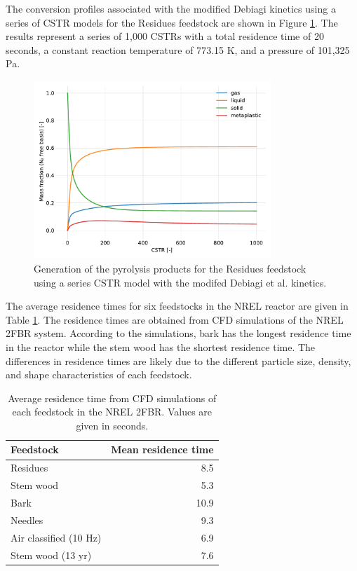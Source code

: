 The conversion profiles associated with the modified Debiagi kinetics using a series of CSTR models for the Residues feedstock are shown in Figure \ref{fig:cstr-products}. The results represent a series of 1,000 CSTRs with a total residence time of 20 seconds, a constant reaction temperature of 773.15 K, and a pressure of 101,325 Pa.

\begin{figure}[H]
    \centering
    \includegraphics[width=0.8\textwidth]{figures/cstr-products.pdf}
    \caption{Generation of the pyrolysis products for the Residues feedstock using a series CSTR model with the modifed Debiagi et al. kinetics.}
    \label{fig:cstr-products}
\end{figure}

The average residence times for six feedstocks in the NREL reactor are given in Table \ref{tab:residence}. The residence times are obtained from CFD simulations of the NREL 2FBR system. According to the simulations, bark has the longest residence time in the reactor while the stem wood has the shortest residence time. The differences in residence times are likely due to the different particle size, density, and shape characteristics of each feedstock.

\begin{table}[H]
    \caption{Average residence time from CFD simulations of each feedstock in the NREL 2FBR. Values are given in seconds.}
    \label{tab:residence}
    \centering
    \begin{tabular}{lr}
        \toprule
        Feedstock & Mean residence time \\
        \midrule
        Residues               & 8.5 \\
        Stem wood              & 5.3 \\
        Bark                   & 10.9 \\
        Needles                & 9.3 \\
        Air classified (10 Hz) & 6.9 \\
        Stem wood (13 yr)      & 7.6 \\
        \bottomrule
    \end{tabular}
\end{table}

